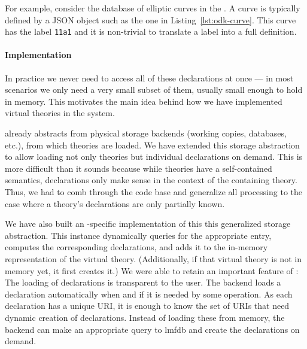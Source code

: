 

For example, consider the database of elliptic curves in the \LMFDB.
A curve is typically defined by a JSON object such as the one in Listing~\ref{lst:odk-curve}.
This curve has the label \texttt{11a1} and it is non-trivial to translate a label into a full definition.

\paragraph{Implementation}
In practice we never need to access all of these declarations at once --- in most
scenarios we only need a very small subset of them, usually small enough to hold in memory.
This motivates the main idea behind how we have implemented virtual theories in the \MMT system.

\MMT already abstracts from physical storage backends (working copies, databases, etc.), from which theories are loaded.
We have extended this storage abstraction to allow loading not only theories but individual declarations on demand.
This is more difficult than it sounds because while theories have a self-contained semantics, declarations only make sense in the context of the containing theory.
Thus, we had to comb through the \MMT code base and generalize all processing to the case where a theory's declarations are only partially known.

We have also built an \LMFDB-specific implementation of this this generalized storage abstraction.
This instance dynamically queries \LMFDB for the appropriate entry, computes the corresponding declarations, and adds it to the in-memory representation of the virtual theory.
(Additionally, if that virtual theory is not in memory yet, it first creates it.)
We were able to retain an important feature of \MMT: The loading of declarations is transparent to the user.
The backend loads a declaration automatically when and if it is needed by some operation.
As each declaration has a unique URI, it is enough to know the set of URIs that need dynamic creation of declarations.
Instead of loading these from memory, the backend can make an appropriate query to lmfdb and create the declarations on demand.


